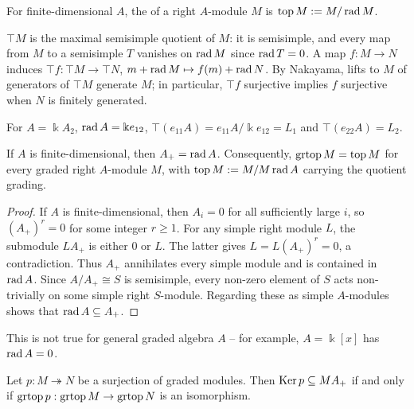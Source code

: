 \begin{advanced}
\begin{definition}\label{def:module-top}
For finite-dimensional $A$, the  of a right $A$-module $M$ is $\operatorname{top}\nolimits M:=M/\operatorname{rad}\nolimits M$.
\end{definition}

$\top M$ is the maximal semisimple quotient of $M$: it is semisimple, and every map from $M$ to a semisimple $T$ vanishes on $\operatorname{rad}\nolimits M$ since $\operatorname{rad}\nolimits T=0$.
A map $f:M\to N$ induces $\top f:\top M\to\top N$, $m+\operatorname{rad}\nolimits M\mapsto f(m)+\operatorname{rad}\nolimits N$.
By Nakayama, lifts to $M$ of generators of $\top M$ generate $M$; in particular, $\top f$ surjective implies $f$ surjective when $N$ is finitely generated.

\begin{example}
For $A=\Bbbk A_2$, $\operatorname{rad}\nolimits A=\Bbbk e_{12}$, $\top(e_{11}A)=e_{11}A/\Bbbk e_{12}=L_1$ and $\top(e_{22}A)=L_2$.
\end{example}


\begin{lemma}\label{lem:graded-radical}
If $A$ is finite-dimensional, then $A_+=\operatorname{rad}\nolimits A$.
Consequently, $\operatorname{grtop}\nolimits M=\operatorname{top}\nolimits M$ for every graded right $A$-module $M$, with $\operatorname{top}\nolimits M:=M/M\operatorname{rad}\nolimits A$ carrying the quotient grading.
\end{lemma}

\begin{proof}
If $A$ is finite-dimensional, then $A_i=0$ for all sufficiently large $i$, so $(A_+)^r=0$ for some integer $r\geq1$.
For any simple right module $L$, the submodule $LA_+$ is either $0$ or $L$.
The latter gives $L=L(A_+)^r=0$, a contradiction.
Thus $A_+$ annihilates every simple module and is contained in $\operatorname{rad}\nolimits A$.
Since $A/A_+\cong S$ is semisimple, every non-zero element of $S$ acts non-trivially on some simple right $S$-module.
Regarding these as simple $A$-modules shows that $\operatorname{rad}\nolimits A\subseteq A_+$.
\end{proof}
\begin{remark}
This is not true for general graded algebra $A$ -- for example, $A=\Bbbk[x]$ has $\operatorname{rad}\nolimits A=0$.
\end{remark}

\end{advanced}


\begin{lemma}\label{lem:minimal-tops}
Let $p:M\twoheadrightarrow N$ be a surjection of graded modules.
Then $\operatorname{Ker}\nolimits p\subseteq MA_+$ if and only if $\operatorname{grtop}\nolimits p:\operatorname{grtop}\nolimits M\to\operatorname{grtop}\nolimits N$ is an isomorphism.
\end{lemma}

